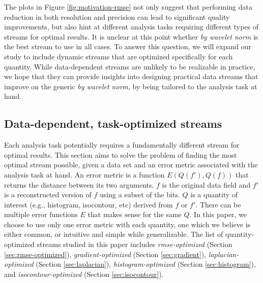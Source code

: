 The plots in Figure \ref{fig:motivation-rmse} not only suggest that performing data reduction in
both resolution and precision can lead to significant quality improvements, but also hint at
different analysis tasks requiring different types of streams for optimal results. It is unclear at
this point whether \emph{by wavelet norm} is the best stream to use in all cases. To answer this
question, we will expand our study to include dynamic streams that are optimized specifically for
each quantity. While data-dependent streams are unlikely to be realizable in practice, we hope that
they can provide insights into designing practical data streams that improve on the generic \emph{by
wavelet norm}, by being tailored to the analysis task at hand.

\subsection{Data-dependent, task-optimized streams}
\label{sec:data_dep_streams}

Each analysis task potentially requires a fundamentally different stream for optimal results. This
section aims to solve the problem of finding the most optimal stream possible, given a data set and
an error metric associated with the analysis task at hand. An error metric is a function
$E(Q(f'),Q(f))$ that returns the distance between its two arguments. $f$ is the original data field
and $f'$ is a reconstructed version of $f$ using a subset of the bits. $Q$ is a quantity of interest
(e.g., histogram, isocontour, etc) derived from $f$ or $f'$. There can be multiple error functions
$E$ that makes sense for the same $Q$. In this paper, we choose to use only one error metric with
each quantity, one which we believe is either common, or intuitive and simple while generalizable.
The list of quantity-optimized streams studied in this paper includes \emph{rmse-optimized} (Section
\ref{sec:rmse-optimized}), \emph{gradient-optimized} (Section \ref{sec:gradient}),
\emph{laplacian-optimized} (Section \ref{sec:laplacian}), \emph{histogram-optimized} (Section
\ref{sec:histogram}), and \emph{isocontour-optimized} (Section \ref{sec:isocontour}).

